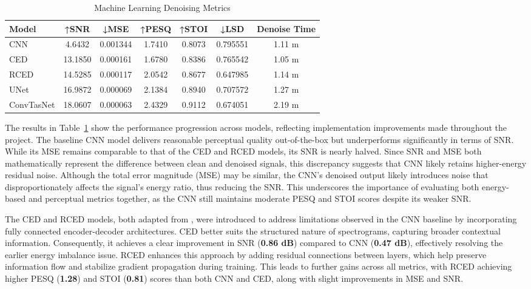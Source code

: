 \vspace{1em}
\begin{table}[H]
\centering
\caption{Machine Learning Denoising Metrics}
\label{tab:ml_denoise}
\begin{tabular}{|l|c|c|c|c|c|c|}
\hline
\textbf{Model} & \textbf{↑SNR} & \textbf{↓MSE} & \textbf{↑PESQ} & \textbf{↑STOI} & \textbf{↓LSD} & \textbf{Denoise Time} \\
\hline
CNN         & 4.6432  & 0.001344 & 1.7410 & 0.8073 & 0.795551 & 1.11 m \\
CED         & 13.1850  & 0.000161 & 1.6780 & 0.8386 & 0.765542 & 1.05 m \\
RCED        & 14.5285  & 0.000117 & 2.0542 & 0.8677 & 0.647985 & 1.14 m \\
UNet        & 16.9872  & 0.000069 & 2.1384 & 0.8940 & 0.707572 & 1.27 m \\
ConvTasNet  & 18.0607 & 0.000063 & 2.4329 & 0.9112 & 0.674051 & 2.19 m \\
\hline
\end{tabular}
\end{table}
The results in Table~\ref{tab:ml_denoise} show the performance progression across models, reflecting implementation improvements made throughout the project. The baseline CNN model delivers reasonable perceptual quality out-of-the-box but underperforms significantly in terms of SNR. While its MSE remains comparable to that of the CED and RCED models, its SNR is nearly halved. Since SNR and MSE both mathematically represent the difference between clean and denoised signals, this discrepancy suggests that CNN likely retains higher-energy residual noise. Although the total error magnitude (MSE) may be similar, the CNN's denoised output likely introduces noise that disproportionately affects the signal's energy ratio, thus reducing the SNR. This underscores the importance of evaluating both energy-based and perceptual metrics together, as the CNN still maintains moderate PESQ and STOI scores despite its weaker SNR.

The CED and RCED models, both adapted from \cite{park2017acoustic}, were introduced to address limitations observed in the CNN baseline by incorporating fully connected encoder-decoder architectures. CED better suits the structured nature of spectrograms, capturing broader contextual information. Consequently, it achieves a clear improvement in SNR (\textbf{0.86 dB}) compared to CNN (\textbf{0.47 dB}), effectively resolving the earlier energy imbalance issue. RCED enhances this approach by adding residual connections between layers, which help preserve information flow and stabilize gradient propagation during training. This leads to further gains across all metrics, with RCED achieving higher PESQ (\textbf{1.28}) and STOI (\textbf{0.81}) scores than both CNN and CED, along with slight improvements in MSE and SNR.

